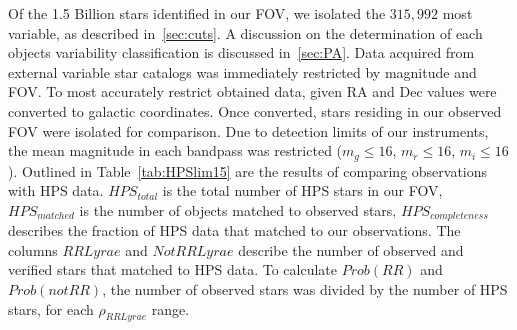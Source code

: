 \documentclass[aps,prb,twocolumn,superscriptaddress]{revtex4-1}
\begin{document}
Of the 1.5 Billion stars identified in our FOV, we isolated the $315,992$ most variable, 
as described in~\cref{sec:cuts}.  
A discussion on the determination of each objects variability classification is discussed in~\cref{sec:PA}.  Data acquired from external 
variable star catalogs was immediately restricted by magnitude and FOV.  
To most accurately restrict obtained data, given RA and Dec values were converted to galactic coordinates.  Once converted, 
stars residing in our observed FOV were isolated for comparison.  Due to detection limits of our instruments, the mean 
magnitude in each bandpass was restricted ($m_{g}\leq16$, $m_{r}\leq16$, $m_{i}\leq16$).
Outlined in Table~\ref{tab:HPSlim15} are the results of comparing observations with HPS data.
$HPS_{total}$ is the total number of HPS stars in our FOV, $HPS_{matched}$ is the number of objects matched to observed stars, $HPS_{completeness}$ describes the fraction of HPS data that matched to our observations.  The columns $RR Lyrae$ and $Not RR Lyrae$ describe the 
number of observed and verified stars that matched to HPS data.  To calculate $Prob(RR)$ and $Prob(notRR)$, the number of observed stars was 
divided by the number of HPS stars, for each $\rho_{RRLyrae}$ range.

\end{document}
